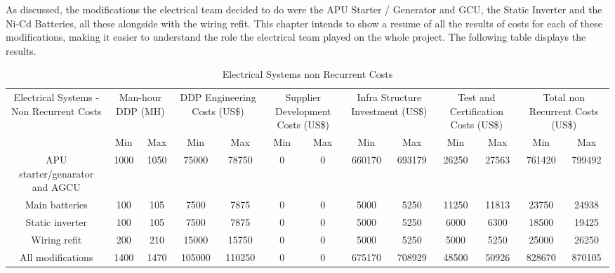As discussed, the modifications the electrical team decided to do were the APU Starter / Generator and GCU, the Static Inverter and the Ni-Cd Batteries, all these alongside with the wiring refit. This chapter intends to show a resume of all the results of costs for each of these modifications, making it easier to understand the role the electrical team played on the whole project. The following table displays the results.

\begin{table}[htbp]
  \centering
  \caption{Electrical Systems non Recurrent Costs}
    \begin{tabular}{ccccccccccccc}
    \toprule
    \multirow{2}[4]{*}{Electrical Systems - Non Recurrent Costs} & \multicolumn{2}{c}{Man-hour DDP (MH)} & \multicolumn{2}{c}{DDP Engineering Costs (US\$)} & \multicolumn{2}{c}{Supplier Development Costs (US\$)} & \multicolumn{2}{c}{Infra Structure Investment (US\$)} & \multicolumn{2}{c}{Test and Certification Costs (US\$)} & \multicolumn{2}{c}{Total non Recurrent Costs (US\$)} \\
          & Min   & Max   & Min   & Max   & Min   & Max   & Min   & Max   & Min   & Max   & Min   & Max \\
    \midrule
    APU starter/genarator and AGCU & 1000  & 1050  & 75000 & 78750 & 0     & 0     & 660170 & 693179 & 26250 & 27563 & 761420 & 799492 \\
    Main batteries & 100   & 105   & 7500  & 7875  & 0     & 0     & 5000  & 5250  & 11250 & 11813 & 23750 & 24938 \\
    Static inverter & 100   & 105   & 7500  & 7875  & 0     & 0     & 5000  & 5250  & 6000  & 6300  & 18500 & 19425 \\
    Wiring refit & 200   & 210   & 15000 & 15750 & 0     & 0     & 5000  & 5250  & 5000  & 5250  & 25000 & 26250 \\
    All modifications & 1400  & 1470  & 105000 & 110250 & 0     & 0     & 675170 & 708929 & 48500 & 50926 & 828670 & 870105 \\
    \bottomrule
    \end{tabular}%
  \label{tab:EleSysNonRecCost}%
\end{table}%

